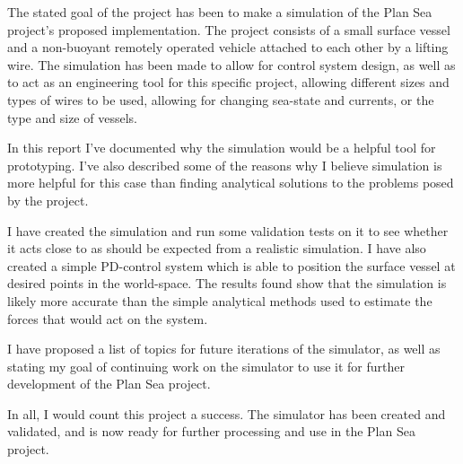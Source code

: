 The stated goal of the project has been to make a simulation of the Plan Sea project's proposed implementation. The project consists of a small surface vessel and a non-buoyant remotely operated vehicle attached to each other by a lifting wire. The simulation has been made to allow for control system design, as well as to act as an engineering tool for this specific project, allowing different sizes and types of wires to be used, allowing for changing sea-state and currents, or the type and size of vessels. 

In this report I've documented why the simulation would be a helpful tool for prototyping. I've also described some of the reasons why I believe simulation is more helpful for this case than finding analytical solutions to the problems posed by the project. 

I have created the simulation and run some validation tests on it to see whether it acts close to as should be expected from a realistic simulation. I have also created a simple PD-control system which is able to position the surface vessel at desired points in the world-space. The results found show that the simulation is likely more accurate than the simple analytical methods used to estimate the forces that would act on the system. 

I have proposed a list of topics for future iterations of the simulator, as well as stating my goal of continuing work on the simulator to use it for further development of the Plan Sea project. 

In all, I would count this project a success. The simulator has been created and validated, and is now ready for further processing and use in the Plan Sea project.

